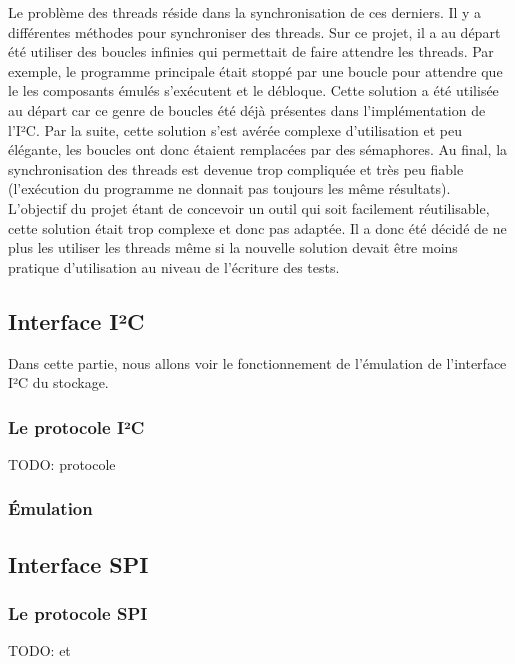 \documentclass[a4paper]{article}
\begin{document}
Le problème des threads réside dans la synchronisation de ces derniers. Il y a
différentes méthodes pour synchroniser des threads. Sur ce projet, il a au
départ été utiliser des boucles infinies qui permettait de faire attendre les
threads. Par exemple, le programme principale était stoppé par une boucle pour
attendre que le les composants émulés s'exécutent et le débloque. Cette solution
a été utilisée au départ car ce genre de boucles été déjà présentes dans
l'implémentation de l'I²C. Par la suite, cette solution s'est avérée complexe
d'utilisation et peu élégante, les boucles ont donc étaient remplacées par des %
sémaphores. Au final, la synchronisation des threads est devenue trop compliquée
et très peu fiable (l'exécution du programme ne donnait pas toujours les même
résultats). L'objectif du projet étant de concevoir un outil qui soit facilement
réutilisable, cette solution était trop complexe et donc pas adaptée. Il a donc
été décidé de ne plus les utiliser les threads même si la nouvelle solution
devait être moins pratique d'utilisation au niveau de l'écriture des tests.

\subsection{Interface I²C}

Dans cette partie, nous allons voir le fonctionnement de l'émulation de
l'interface I²C du stockage.

\subsubsection*{Le protocole I²C}

TODO: protocole \cite{mankar2014review}

\subsubsection*{Émulation}

\subsection{Interface SPI}

\subsubsection*{Le protocole SPI}

TODO: \cite{dhaker2018introduction} et \cite{li2014design}
\end{document}

